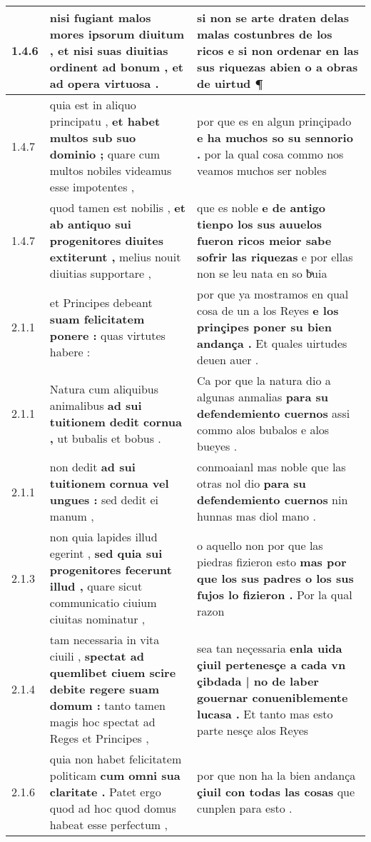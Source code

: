 \begin{tabular}{|p{1cm}|p{6.5cm}|p{6.5cm}|}
1.4.6 & nisi fugiant malos mores ipsorum diuitum , \textbf{ et nisi suas diuitias ordinent ad bonum , } et ad opera virtuosa . & si non se arte draten delas malas costunbres de los ricos \textbf{ e si non ordenar en las sus riquezas abien o a obras de uirtud } ¶ \\\hline
1.4.7 & quia est in aliquo principatu , \textbf{ et habet multos sub suo dominio ; } quare cum multos nobiles videamus esse impotentes , & por que es en algun prinçipado \textbf{ e ha muchos so su sennorio . } por la qual cosa commo nos veamos muchos ser nobles \\\hline
1.4.7 & quod tamen est nobilis , \textbf{ et ab antiquo sui progenitores diuites extiterunt , } melius nouit diuitias supportare , & que es noble \textbf{ e de antigo tienpo los sus auuelos fueron ricos meior sabe sofrir las riquezas } e por ellas non se leu nata en so ƀͣuia \\\hline
2.1.1 & et Principes debeant \textbf{ suam felicitatem ponere : } quas virtutes habere : & por que ya mostramos en qual cosa de un a los Reyes \textbf{ e los prinçipes poner su bien andança . } Et quales uirtudes deuen auer . \\\hline
2.1.1 & Natura cum aliquibus animalibus \textbf{ ad sui tuitionem dedit cornua , } ut bubalis et bobus . & Ca por que la natura dio a algunas anmalias \textbf{ para su defendemiento cuernos } assi commo alos bubalos e alos bueyes . \\\hline
2.1.1 & non dedit \textbf{ ad sui tuitionem cornua vel ungues : } sed dedit ei manum , & conmoaianl mas noble que las otras nol dio \textbf{ para su defendemiento cuernos } nin hunnas mas diol mano . \\\hline
2.1.3 & non quia lapides illud egerint , \textbf{ sed quia sui progenitores fecerunt illud , } quare sicut communicatio ciuium ciuitas nominatur , & o aquello non por que las piedras fizieron esto \textbf{ mas por que los sus padres o los sus fujos lo fizieron . } Por la qual razon \\\hline
2.1.4 & tam necessaria in vita ciuili , \textbf{ spectat ad quemlibet ciuem scire debite regere suam domum : } tanto tamen magis hoc spectat ad Reges et Principes , & sea tan neçessaria \textbf{ enla uida çiuil pertenesçe a cada vn çibdada | no de laber gouernar conueniblemente lucasa . } Et tanto mas esto parte nesçe alos Reyes \\\hline
2.1.6 & quia non habet felicitatem politicam \textbf{ cum omni sua claritate . } Patet ergo quod ad hoc quod domus habeat esse perfectum , & por que non ha la bien andança \textbf{ çiuil con todas las cosas } que cunplen para esto . \\\hline

\end{tabular}
